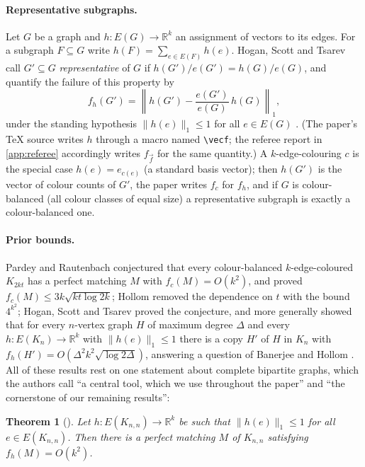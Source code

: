 \documentclass[11pt,a4paper]{article}
\theoremstyle{plain}
\newtheorem{theorem}{Theorem}[section]
\theoremstyle{definition}
\theoremstyle{remark}
\newcommand{\R}{\mathbb R}
\begin{document}
\paragraph{Representative subgraphs.}
Let $G$ be a graph and $h\colon E(G)\to\R^k$ an assignment of vectors to its edges. For a subgraph $F\subseteq G$ write $h(F)=\sum_{e\in E(F)}h(e)$. Hogan, Scott and Tsarev \cite{HST26} call $G'\subseteq G$ \emph{representative} of $G$ if $h(G')/e(G')=h(G)/e(G)$, and quantify the failure of this property by
\begin{equation}\label{eq:fh}
 f_h(G')=\left\|h(G')-\frac{e(G')}{e(G)}\,h(G)\right\|_1 ,
\end{equation}
under the standing hypothesis $\|h(e)\|_1\le1$ for all $e\in E(G)$ \cite[\S1]{HST26}. (The paper's TeX source writes $h$ through a macro named \texttt{\textbackslash vecf}; the referee report in \cref{app:referee} accordingly writes $f_{\vec f}$ for the same quantity.) A $k$-edge-colouring $c$ is the special case $h(e)=e_{c(e)}$ (a standard basis vector); then $h(G')$ is the vector of colour counts of $G'$, the paper writes $f_c$ for $f_h$, and if $G$ is colour-balanced (all colour classes of equal size) a representative subgraph is exactly a colour-balanced one.

\paragraph{Prior bounds.}
Pardey and Rautenbach \cite{PR22} conjectured that every colour-balanced $k$-edge-coloured $K_{2kt}$ has a perfect matching $M$ with $f_c(M)=O(k^2)$, and proved $f_c(M)\le3k\sqrt{kt\log 2k}$; Hollom \cite{Hol25} removed the dependence on $t$ with the bound $4^{k^2}$; Hogan, Scott and Tsarev \cite[Theorem~1.2]{HST26} proved the conjecture, and more generally showed \cite[Theorem~1.4]{HST26} that for every $n$-vertex graph $H$ of maximum degree $\Delta$ and every $h\colon E(K_n)\to\R^k$ with $\|h(e)\|_1\le 1$ there is a copy $H'$ of $H$ in $K_n$ with $f_h(H')=O(\Delta^2k^2\sqrt{\log2\Delta})$, answering a question of Banerjee and Hollom \cite{BH26}. All of these results rest on one statement about complete bipartite graphs, which the authors call ``a central tool, which we use throughout the paper'' and ``the cornerstone of our remaining results'':

\begin{theorem}[{\cite[Theorem~1.9]{HST26}}]\label{thm:hst19}
Let $h\colon E(K_{n,n})\to\R^k$ be such that $\|h(e)\|_1\le1$ for all $e\in E(K_{n,n})$. Then there is a perfect matching $M$ of $K_{n,n}$ satisfying $f_h(M)=O(k^2)$.
\end{theorem}
\end{document}
